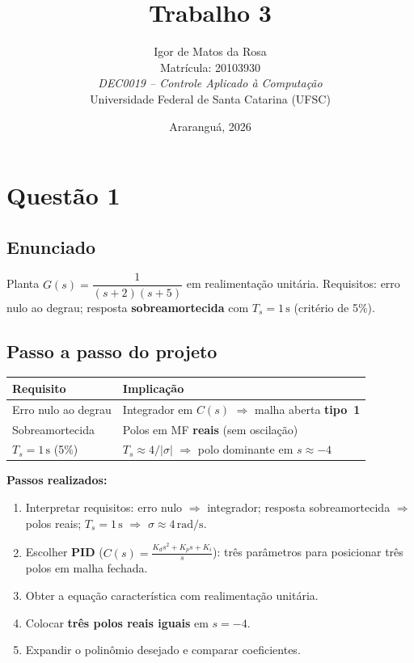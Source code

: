 \documentclass[11pt,a4paper]{article}
\title{\textbf{Trabalho 3}}
\author{
  Igor de Matos da Rosa\\
  Matrícula: 20103930\\[0.4em]
  \textit{DEC0019 -- Controle Aplicado à Computação}\\
  Universidade Federal de Santa Catarina (UFSC)
}
\date{Araranguá, 2026}
\begin{document}
\maketitle

\section*{Questão 1}

\subsection*{Enunciado}

Planta $G(s)=\dfrac{1}{(s+2)(s+5)}$ em realimentação unitária. Requisitos:
erro nulo ao degrau; resposta \textbf{sobreamortecida} com $T_s=1\,\mathrm{s}$
(critério de 5\%).

\subsection*{Passo a passo do projeto}

\begin{center}
\begin{tabular}{@{}ll@{}}
  \toprule
  Requisito & Implicação \\
  \midrule
  Erro nulo ao degrau & Integrador em $C(s)$ $\Rightarrow$ malha aberta \textbf{tipo~1} \\
  Sobreamortecida & Polos em MF \textbf{reais} (sem oscilação) \\
  $T_s=1\,\mathrm{s}$ (5\%) & $T_s\approx 4/|\sigma|$ $\Rightarrow$ polo dominante em $s\approx -4$ \\
  \bottomrule
\end{tabular}
\end{center}

\textbf{Passos realizados:}
\begin{enumerate}[leftmargin=*]
  \item Interpretar requisitos: erro nulo $\Rightarrow$ integrador; resposta
        sobreamortecida $\Rightarrow$ polos reais; $T_s=1\,\mathrm{s}$
        $\Rightarrow$ $\sigma\approx 4\,\mathrm{rad/s}$.
  \item Escolher \textbf{PID} ($C(s)=\frac{K_d s^2+K_p s+K_i}{s}$): três
        parâmetros para posicionar três polos em malha fechada.
  \item Obter a equação característica com realimentação unitária.
  \item Colocar \textbf{três polos reais iguais} em $s=-4$.
  \item Expandir o polinômio desejado e comparar coeficientes.
\end{enumerate}
\end{document}
